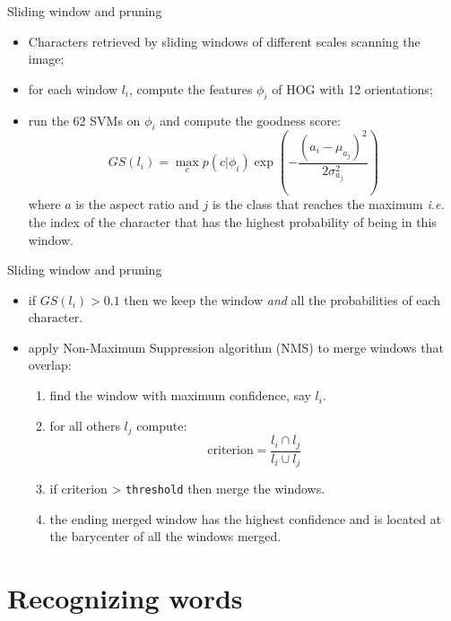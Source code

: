 \documentclass[handout]{beamer}
\begin{document}
\begin{frame}{Sliding window and pruning}
\begin{itemize}
	\item Characters retrieved by sliding windows of different scales scanning the image;
	\item for each window $l_i$, compute the features $\phi_i$ of HOG with 12 orientations;
	\item run the 62 SVMs on $\phi_i$ and compute the goodness score:
	\begin{equation}
	GS(l_i) = \max_c p(c|\phi_i) \exp\left( - \frac{(a_i - \mu_{a_j})^2}{2\sigma_{a_j}^2} \right)
	\label{eq:}
	\end{equation}
	where $a$ is the aspect ratio and $j$ is the class that reaches the maximum \emph{i.e.} the index of the character that has the highest probability of being in this window.
\end{itemize}
\end{frame}

\begin{frame}{Sliding window and pruning}
\begin{itemize}
	\item if $GS(l_i) > 0.1$ then we keep the window \emph{and} all the probabilities of each character.
	\item apply Non-Maximum Suppression algorithm (NMS) to merge windows that overlap:
	\begin{enumerate}
		\item find the window with maximum confidence, say $l_i$.
		\item for all others $l_j$ compute:
		\begin{equation}
		\text{criterion} = \frac{l_i \cap l_j}{l_i \cup l_j}
		\label{eq:}
		\end{equation}
		\item if criterion > \texttt{threshold} then merge the windows.
		\item the ending merged window has the highest confidence and is located at the barycenter of all the windows merged.
	\end{enumerate}
\end{itemize}
\end{frame}


\section{Recognizing words}
\end{document}

